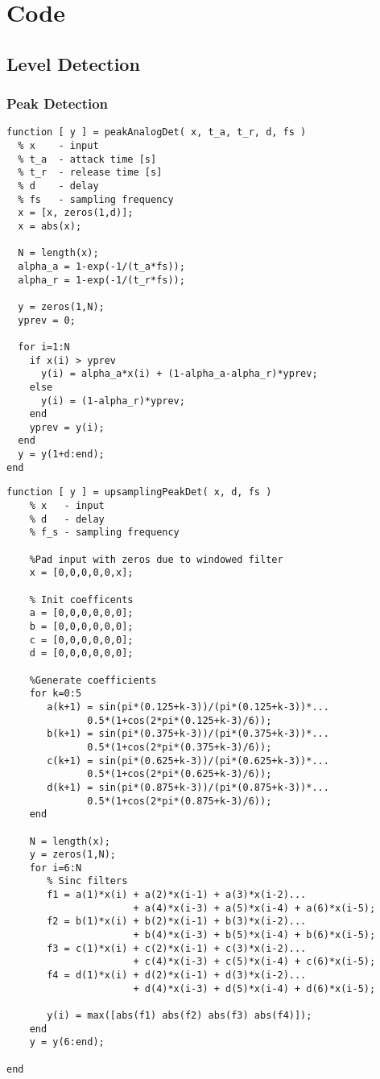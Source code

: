 \documentclass[../main2.tex]{subfiles}
\begin{document}
\section{Code}\label{appendix_code}
\subsection{Level Detection}
\subsubsection{Peak Detection}
\begin{lstlisting}[style=customc]
function [ y ] = peakAnalogDet( x, t_a, t_r, d, fs )
  % x    - input
  % t_a  - attack time [s]
  % t_r  - release time [s]
  % d    - delay
  % fs   - sampling frequency 
  x = [x, zeros(1,d)];
  x = abs(x);
    
  N = length(x);
  alpha_a = 1-exp(-1/(t_a*fs));
  alpha_r = 1-exp(-1/(t_r*fs));
    
  y = zeros(1,N);
  yprev = 0;
  
  for i=1:N
    if x(i) > yprev
      y(i) = alpha_a*x(i) + (1-alpha_a-alpha_r)*yprev;
    else
      y(i) = (1-alpha_r)*yprev;
    end
    yprev = y(i);
  end
  y = y(1+d:end);
end
\end{lstlisting}
\begin{lstlisting}[style=customc]
function [ y ] = upsamplingPeakDet( x, d, fs )
    % x   - input
    % d   - delay
    % f_s - sampling frequency

    %Pad input with zeros due to windowed filter
    x = [0,0,0,0,0,x];
    
    % Init coefficents
    a = [0,0,0,0,0,0];
    b = [0,0,0,0,0,0];
    c = [0,0,0,0,0,0];
    d = [0,0,0,0,0,0];
    
    %Generate coefficients
    for k=0:5
       a(k+1) = sin(pi*(0.125+k-3))/(pi*(0.125+k-3))*...
              0.5*(1+cos(2*pi*(0.125+k-3)/6));
       b(k+1) = sin(pi*(0.375+k-3))/(pi*(0.375+k-3))*...
              0.5*(1+cos(2*pi*(0.375+k-3)/6));
       c(k+1) = sin(pi*(0.625+k-3))/(pi*(0.625+k-3))*...
              0.5*(1+cos(2*pi*(0.625+k-3)/6));
       d(k+1) = sin(pi*(0.875+k-3))/(pi*(0.875+k-3))*...
              0.5*(1+cos(2*pi*(0.875+k-3)/6));
    end
    
    N = length(x);
    y = zeros(1,N);
    for i=6:N 
       % Sinc filters
       f1 = a(1)*x(i) + a(2)*x(i-1) + a(3)*x(i-2)...
                      + a(4)*x(i-3) + a(5)*x(i-4) + a(6)*x(i-5);
       f2 = b(1)*x(i) + b(2)*x(i-1) + b(3)*x(i-2)...
                      + b(4)*x(i-3) + b(5)*x(i-4) + b(6)*x(i-5);
       f3 = c(1)*x(i) + c(2)*x(i-1) + c(3)*x(i-2)...
                      + c(4)*x(i-3) + c(5)*x(i-4) + c(6)*x(i-5);
       f4 = d(1)*x(i) + d(2)*x(i-1) + d(3)*x(i-2)...
                      + d(4)*x(i-3) + d(5)*x(i-4) + d(6)*x(i-5);
                  
       y(i) = max([abs(f1) abs(f2) abs(f3) abs(f4)]);
    end
    y = y(6:end);
  
end
\end{lstlisting}
\end{document}
